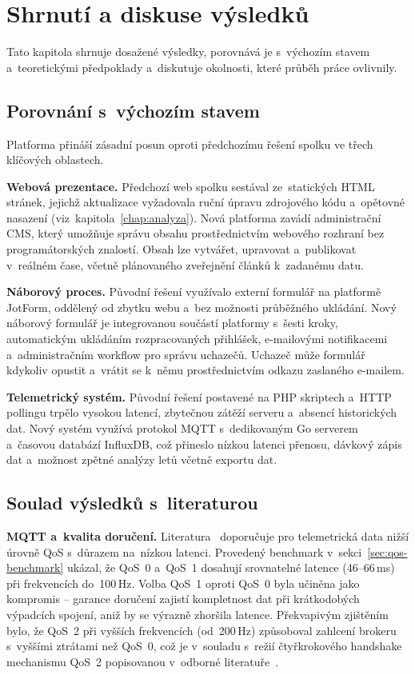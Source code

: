\chapter{Shrnutí a diskuse výsledků}
\label{chap:diskuse}

Tato kapitola shrnuje dosažené výsledky, porovnává je s~výchozím stavem a~teoretickými předpoklady a~diskutuje okolnosti, které průběh práce ovlivnily.

\section{Porovnání s~výchozím stavem}

Platforma přináší zásadní posun oproti předchozímu řešení spolku ve třech klíčových oblastech.

\textbf{Webová prezentace.} Předchozí web spolku sestával ze~statických HTML stránek, jejichž aktualizace vyžadovala ruční úpravu zdrojového kódu a~opětovné nasazení (viz~kapitola~\ref{chap:analyza}). Nová platforma zavádí administrační CMS, který umožňuje správu obsahu prostřednictvím webového rozhraní bez programátorských znalostí. Obsah lze vytvářet, upravovat a~publikovat v~reálném čase, včetně plánovaného zveřejnění článků k~zadanému datu.

\textbf{Náborový proces.} Původní řešení využívalo externí formulář na platformě JotForm, oddělený od zbytku webu a~bez možnosti průběžného ukládání. Nový náborový formulář je integrovanou součástí platformy s~šesti kroky, automatickým ukládáním rozpracovaných přihlášek, e-mailovými notifikacemi a~administračním workflow pro správu uchazečů. Uchazeč může formulář kdykoliv opustit a~vrátit se k~němu prostřednictvím odkazu zaslaného e-mailem.

\textbf{Telemetrický systém.} Původní řešení postavené na PHP skriptech a~HTTP pollingu trpělo vysokou latencí, zbytečnou zátěží serveru a~absencí historických dat. Nový systém využívá protokol MQTT s~dedikovaným Go serverem a~časovou databází InfluxDB, což přineslo nízkou latenci přenosu, dávkový zápis dat a~možnost zpětné analýzy letů včetně exportu dat.

\section{Soulad výsledků s~literaturou}

\textbf{MQTT a~kvalita doručení.} Literatura~\cite{kegenbekov2022mqtt} doporučuje pro telemetrická data nižší úrovně QoS s~důrazem na~nízkou latenci. Provedený benchmark v~sekci~\ref{sec:qos-benchmark} ukázal, že QoS~0 a~QoS~1 dosahují srovnatelné latence (46--66\,ms) při frekvencích do~100\,Hz. Volba QoS~1 oproti QoS~0 byla učiněna jako kompromis -- garance doručení zajistí kompletnost dat při krátkodobých výpadcích spojení, aniž by se výrazně zhoršila latence. Překvapivým zjištěním bylo, že QoS~2 při vyšších frekvencích (od~200\,Hz) způsoboval zahlcení brokeru s~vyššími ztrátami než QoS~0, což je v~souladu s~režií čtyřkrokového handshake mechanismu QoS~2 popisovanou v~odborné literatuře~\cite{mqtt2014oasis}.

